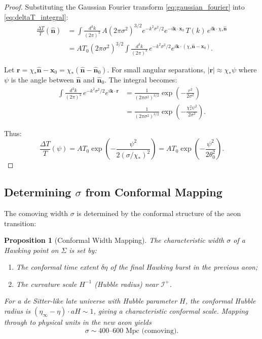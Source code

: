 \documentclass[11pt,a4paper]{article}
\theoremstyle{plain}
\newtheorem{proposition}[theorem]{Proposition}
\theoremstyle{definition}
\theoremstyle{remark}
\newcommand{\scriplus}{\mathcal{I}^+}
\begin{document}
\begin{proof}
Substituting the Gaussian Fourier transform \eqref{eq:gaussian_fourier} into \eqref{eq:deltaT_integral}:
\begin{align}
    \frac{\Delta T}{T}(\hat{\bm{n}}) &= \int \frac{d^3k}{(2\pi)^3} \, A(2\pi\sigma^2)^{3/2} e^{-k^2\sigma^2/2} e^{-i\bm{k}\cdot\bm{x}_0} \, T(k) \, e^{i\bm{k}\cdot\chi_\ast\hat{\bm{n}}} \nonumber \\
    &= A T_0 (2\pi\sigma^2)^{3/2} \int \frac{d^3k}{(2\pi)^3} \, e^{-k^2\sigma^2/2} e^{i\bm{k}\cdot(\chi_\ast\hat{\bm{n}} - \bm{x}_0)}.
\end{align}

Let $\bm{r} = \chi_\ast\hat{\bm{n}} - \bm{x}_0 = \chi_\ast(\hat{\bm{n}} - \hat{\bm{n}}_0)$. For small angular separations, $|\bm{r}| \approx \chi_\ast \psi$ where $\psi$ is the angle between $\hat{\bm{n}}$ and $\hat{\bm{n}}_0$. The integral becomes:
\begin{align}
    \int \frac{d^3k}{(2\pi)^3} \, e^{-k^2\sigma^2/2} e^{i\bm{k}\cdot\bm{r}} &= \frac{1}{(2\pi\sigma^2)^{3/2}} \exp\left( -\frac{r^2}{2\sigma^2} \right) \nonumber \\
    &= \frac{1}{(2\pi\sigma^2)^{3/2}} \exp\left( -\frac{\chi_\ast^2 \psi^2}{2\sigma^2} \right).
\end{align}

Thus:
\begin{equation}
    \frac{\Delta T}{T}(\psi) = A T_0 \exp\left( -\frac{\psi^2}{2(\sigma/\chi_\ast)^2} \right) = A T_0 \exp\left( -\frac{\psi^2}{2\theta_0^2} \right).
\end{equation}
\end{proof}

\subsection{Determining \texorpdfstring{$\sigma$}{sigma} from Conformal Mapping}

The comoving width $\sigma$ is determined by the conformal structure of the aeon transition:

\begin{proposition}[Conformal Width Mapping]\label{prop:sigma_conformal}
The characteristic width $\sigma$ of a Hawking point on $\Sigma$ is set by:
\begin{enumerate}
    \item The conformal time extent $\delta\eta$ of the final Hawking burst in the previous aeon;
    \item The curvature scale $H^{-1}$ (Hubble radius) near $\scriplus$.
\end{enumerate}
For a de Sitter-like late universe with Hubble parameter $H$, the conformal Hubble radius is $(\eta_\infty - \eta) \cdot aH \sim 1$, giving a characteristic conformal scale. Mapping through to physical units in the new aeon yields
\begin{equation}\label{eq:sigma_estimate}
    \sigma \sim 400\text{--}600 \text{ Mpc (comoving)}.
\end{equation}
\end{proposition}
\end{document}
